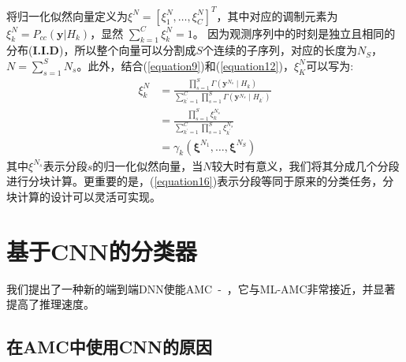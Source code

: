 \documentclass[final]{cvpr}
\begin{document}
将归一化似然向量定义为$\xi^N=[\xi^N_1,\dots,\xi^N_C]^T$，其中对应的调制元素为$\xi^N_k=P_{cc}(\mathbf{y}|H_k)$，显然
$\sum_{k=1}^C \xi^N_k = 1$。
因为观测序列中的时刻是独立且相同的分布(\textbf{I.I.D})，所以整个向量可以分割成$S$个连续的子序列，对应的长度为$N_S$，$N=\sum^S_{s=1}N_s$。此外，结合(\ref{equation9})和(\ref{equation12})，$\xi^N_K$可以写为:
\begin{equation}
\begin{aligned}
\xi_{k}^{N} &=\frac{\prod_{s=1}^{S} \Gamma\left(\mathbf{y}^{N_{s}} \mid H_{k}\right)}{\sum_{k^{\prime}=1}^{C} \prod_{s=1}^{S} \Gamma\left(\mathbf{y}^{N_{s}} \mid H_{k^{\prime}}\right)} \\
&=\frac{\prod_{s=1}^{S} \xi_{k}^{N_{s}}}{\sum_{k^{\prime}=1}^{C} \prod_{s=1}^{S} \xi_{k^{\prime}}^{N_{s}}} \\
&=\gamma_{k}\left(\boldsymbol{\xi}^{N_{1}}, \ldots, \boldsymbol{\xi}^{N_{S}}\right)\label{equation16}
\end{aligned}
\end{equation}
其中$\xi^{N_s}$表示分段$s$的归一化似然向量，当$N$较大时有意义，我们将其分成几个分段进行分块计算。更重要的是，(\ref{equation16})表示分段等同于原来的分类任务，分块计算的设计可以灵活可实现。

\section{基于CNN的分类器}\label{CNNClassifier}

我们提出了一种新的端到端DNN使能AMC~\cite{r32}-~\cite{r34}，它与ML-AMC非常接近，并显著提高了推理速度。
\subsection{在AMC中使用CNN的原因}\label{useCNNreason}
\end{document}
